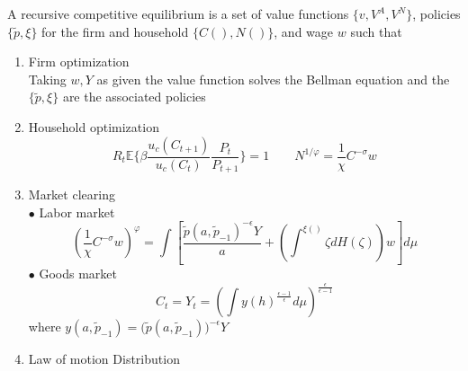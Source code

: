 \documentclass[a4paper,10pt]{article}  %
\begin{document}
\begin{equil}
   A recursive competitive equilibrium is a set of value functions $ \Big\{ v, V^A, V^{N} \Big\} $,
   policies $ \{ \tilde{p}, \xi \} $ for the firm and household $ \Big\{ C( ), N( ) \Big\} $, 
   and wage $ w $ such that
   \begin{enumerate}
      
      \item Firm optimization \\
      Taking $ w,Y $ as given the value function solves the Bellman equation and
      the $ \{ \tilde{p}, \xi \} $ are the associated policies

      \item Household optimization \\
      \[
         R_t \mathbb{E} \bigg\{ \beta \frac{ u_c( C_{t+1} ) }{ u_c(C_t) } \frac{ P_{t} }{ P_{t+1} } \bigg\} = 1 
         \qquad
         N^{1/\varphi} = \frac{1}{\chi} C^{-\sigma}  w
      \]

      \item Market clearing\\
      $\bullet $ Labor market
      \begin{equation}
         \label{eq:labor_market}
         \left( \frac{1}{\chi} C^{-\sigma}  w \right)^{\varphi} = 
         \int 
         \left[ 
            \frac{ \tilde{p}( a,\tilde{p}_{-1} )^{-\epsilon}Y }{ a }  + \left( \int^{\xi( )} \zeta dH( \zeta) \right) w 
         \right]d\mu
      \end{equation}
      $\bullet $ Goods market
      \begin{equation}
         \label{eq:good_market}
         C_t = Y_t = \left( \int y(h)^{ \frac{\epsilon-1}{\epsilon} } d\mu \right)^{ \frac{\epsilon}{\epsilon-1} }
      \end{equation}
      where $ y( a,\tilde{p}_{-1} ) = \Big( \tilde{p}(a,\tilde{p}_{-1}) \Big)^{-\epsilon} Y  $
      \item Law of motion Distribution
   \end{enumerate}
\end{equil}


\end{document}
